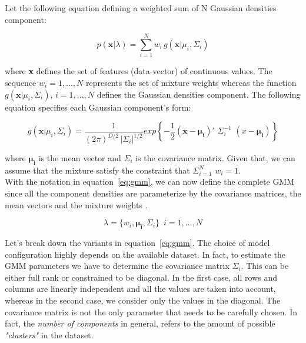 \noindent Let the following equation defining a weighted sum of N Gaussian densities component:

\begin{equation}
	p(\textbf{x}|\lambda) = \sum_{i=1}^{N} w_{i} \, g(\textbf{x}|\mu_{i}, \Sigma_{i})
\end{equation}

\noindent where \textbf{x} defines the set of features (data-vector) of continuous values. The sequence $w_{i} = 1, ... , N$ represents the set of mixture weights whereas the function $g(\textbf{x}|\mu_{i}, \Sigma_{i}), \, i = 1, ... , N$ defines the Gaussian densities component. The following equation specifies each Gaussian component's form:

\begin{equation}
	g(\textbf{x}|\mu_{i}, \Sigma_{i}) = \frac{1}{(2\pi)^{D/2} \, |\Sigma_{i}|^{1/2}} exp \left \{ -\frac{1}{2} (\textbf{x} - \mathbf{\mu_{i}})' \,\, \Sigma_{i}^{-1} \,\, (x - \mathbf{\mu_{i}}) \right \}
\end{equation}

\noindent where $\mathbf{\mu_{i}}$ is the mean vector and $\Sigma_{i}$ is the covariance matrix. Given that, we can assume that the mixture satisfy the constraint that $\Sigma_{i=1}^{N} \,\, w_{i} = 1$. \\

\noindent With the notation in equation~\ref{eq:gmm}, we can now define the complete GMM since all the component densities are parameterize by the covariance matrices, the mean vectors and the mixture weights \cite{reynolds2000speaker}.

\begin{equation}
\label{eq:gmm}
	\lambda = \{ w_{i}, \mathbf{\mu_{i}}, \Sigma_{i}\} \,\,\, i = 1, ... , N
\end{equation}

\noindent Let's break down the variants in equation~\ref{eq:gmm}. The choice of model configuration highly depends on the available dataset. In fact, to estimate the GMM parameters we have to determine the covariance matrix $\Sigma_{i}$. This can be either full rank or constrained to be diagonal. In the first case, all rows and columns are linearly independent and all the values are taken into account, whereas in the second case, we consider only the values in the diagonal. The covariance matrix is not the only parameter that needs to be carefully chosen. In fact, the \textit{number of components} in general, refers to the amount of possible  \textit{"clusters"} in the dataset. \\

